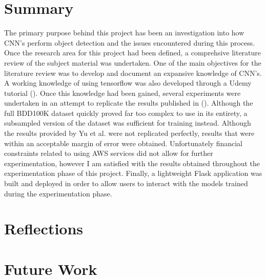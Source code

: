 \documentclass[12pt]{report}
\begin{document}
\section{Summary}
\begin{flushleft}
The primary purpose behind this project has been an investigation into how CNN's perform object detection and the issues encountered during this process. Once the research area for this project had been defined, a comprehsive literature review of the subject material was undertaken. One of the main objectives for the literature review was to develop and document an expansive knowledge of CNN's. A working knowledge of using tensorflow was also developed through a Udemy tutorial (\cite{udemy}). Once this knowledge had been gained, several experiments were undertaken in an attempt to replicate the results published in (\cite{yu2018bdd100k}). Although the full BDD100K dataset quickly proved far too complex to use in its entirety, a subsampled version of the dataset was sufficient for training instead. Although the results provided by Yu et al. were not replicated perfectly, results that were within an acceptable margin of error were obtained. Unfortunately financial constraints related to using AWS services did not allow for further experimentation, however I am satisfied with the results obtained throughout the experimentation phase of this project. Finally, a lightweight Flask application was built and deployed in order to allow users to interact with the models trained during the experimentation phase.
\end{flushleft}

\section{Reflections}

\section{Future Work}

\printbibliography
\end{document}
